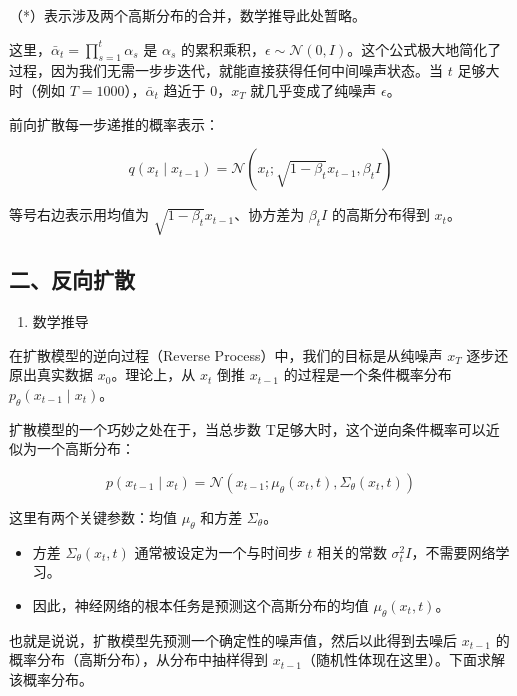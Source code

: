 （*）表示涉及两个高斯分布的合并，数学推导此处暂略。

这里，\(\bar{\alpha}_t=\prod_{s=1}^{t}\alpha_s\) 是 \(\alpha_s\) 的累积乘积，\(\epsilon\sim\mathcal{N}(0,I)\)。这个公式极大地简化了过程，因为我们无需一步步迭代，就能直接获得任何中间噪声状态。当 \(t\) 足够大时（例如 \(T=1000\)），\(\bar{\alpha}_t\) 趋近于 \(0\)，\(x_T\) 就几乎变成了纯噪声 \(\epsilon\)。

前向扩散每一步递推的概率表示：

\[
q(x_t\mid x_{t-1}) = \mathcal{N}(x_t;\sqrt{1-\beta_t}x_{t-1},\beta_t I)
\]

等号右边表示用均值为 \(\sqrt{1-\beta_t}x_{t-1}\)、协方差为 \(\beta_t I\) 的高斯分布得到 \(x_t\)。

\hypertarget{ux4e8cux53cdux5411ux6269ux6563}{%
\subsection{二、反向扩散}\label{ux4e8cux53cdux5411ux6269ux6563}}

\begin{enumerate}
\def\labelenumi{\arabic{enumi}.}
\tightlist
\item
  数学推导
\end{enumerate}

在扩散模型的逆向过程（Reverse Process）中，我们的目标是从纯噪声 \(x_T\) 逐步还原出真实数据 \(x_0\)。理论上，从 \(x_t\) 倒推 \(x_{t-1}\) 的过程是一个条件概率分布 \(p_\theta(x_{t-1}\mid x_t)\)。

扩散模型的一个巧妙之处在于，当总步数 T足够大时，这个逆向条件概率可以近似为一个高斯分布：

\[
p(x_{t-1}\mid x_t)=\mathcal{N}(x_{t-1};\mu_\theta(x_t,t),\Sigma_\theta(x_t,t))
\]

这里有两个关键参数：均值 \(\mu_\theta\) 和方差 \(\Sigma_\theta\)。

\begin{itemize}
\tightlist
\item
  方差 \(\Sigma_\theta(x_t,t)\) 通常被设定为一个与时间步 \(t\) 相关的常数 \(\sigma_t^2 I\)，不需要网络学习。
\item
  因此，神经网络的根本任务是预测这个高斯分布的均值 \(\mu_\theta(x_t,t)\)。
\end{itemize}

也就是说说，扩散模型先预测一个确定性的噪声值，然后以此得到去噪后 \(x_{t-1}\) 的概率分布（高斯分布），从分布中抽样得到 \(x_{t-1}\)（随机性体现在这里）。下面求解该概率分布。

